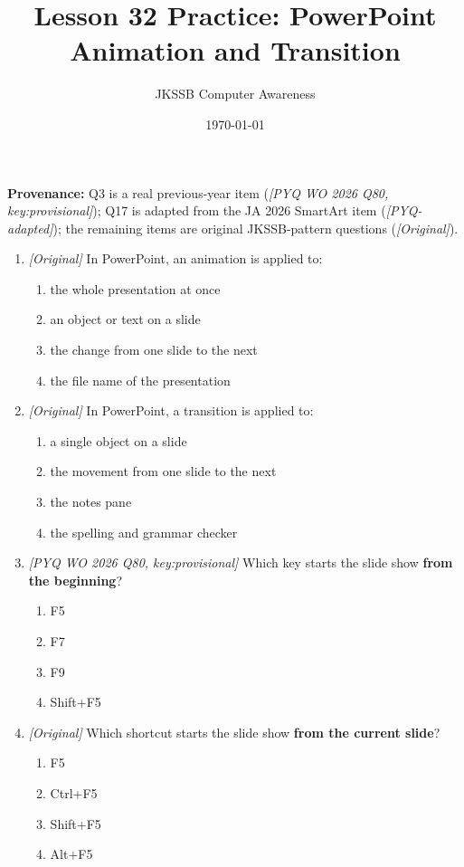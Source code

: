 \documentclass[11pt]{article}
\title{Lesson 32 Practice: PowerPoint Animation and Transition}
\author{JKSSB Computer Awareness}
\date{\today}
\begin{document}
\maketitle
\noindent\textbf{Provenance:} Q3 is a real previous-year item
(\textit{[PYQ WO 2026 Q80, key:provisional]}); Q17 is adapted from the JA 2026
SmartArt item (\textit{[PYQ-adapted]}); the remaining items are original
JKSSB-pattern questions (\textit{[Original]}).

\begin{enumerate}[label=\textbf{Q\arabic*.}, leftmargin=*]
\item \textit{[Original]} In PowerPoint, an animation is applied to:
  \begin{enumerate}[label=\Alph*.]
    \item the whole presentation at once
    \item an object or text on a slide
    \item the change from one slide to the next
    \item the file name of the presentation
  \end{enumerate}
\item \textit{[Original]} In PowerPoint, a transition is applied to:
  \begin{enumerate}[label=\Alph*.]
    \item a single object on a slide
    \item the movement from one slide to the next
    \item the notes pane
    \item the spelling and grammar checker
  \end{enumerate}
\item \textit{[PYQ WO 2026 Q80, key:provisional]} Which key starts the slide
  show \textbf{from the beginning}?
  \begin{enumerate}[label=\Alph*.]
    \item F5
    \item F7
    \item F9
    \item Shift+F5
  \end{enumerate}
\item \textit{[Original]} Which shortcut starts the slide show \textbf{from the
  current slide}?
  \begin{enumerate}[label=\Alph*.]
    \item F5
    \item Ctrl+F5
    \item Shift+F5
    \item Alt+F5

\end{enumerate}
\end{enumerate}
\end{document}

